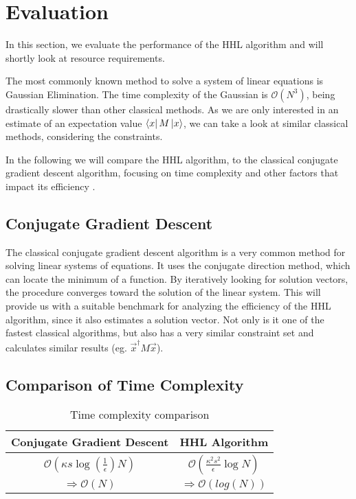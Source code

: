 \section{Evaluation}

\begin{comment}
look at gauß verfahren 
not fastest
look at same constraints 
conjugate gradient descent much faster with similiar requirements
only interested in estimate of $\vec{x}^\dagger M \vec x$
this runs in $ \mathcal{O}(\kappa s log{\left(\frac 1 \epsilon\right)} N ) $
where 
\end{comment}

In this section, we evaluate the performance of the HHL algorithm and will shortly look at resource requirements.

The most commonly known method to solve a system of linear equations is Gaussian Elimination. 
The time complexity of the Gaussian is $\mathcal{O} (N^3)$, being drastically slower than other classical methods.
As we are only interested in an estimate of an expectation value $\bra x M \ket x$, we can take a look at similar classical methods, considering the constraints.

In the following we will compare the HHL algorithm, to the classical conjugate gradient descent algorithm, focusing on time complexity and other factors that impact its efficiency \cite{hhl}.

\subsection{Conjugate Gradient Descent}
The classical conjugate gradient descent algorithm is a very common method for solving linear systems of equations. 
It uses the conjugate direction method, which can locate the minimum of a function. 
By iteratively looking for solution vectors, the procedure converges toward the solution of the linear system.
This will provide us with a suitable benchmark for analyzing the efficiency of the HHL algorithm, since it also estimates a solution vector.
Not only is it one of the fastest classical algorithms, but also has a very similar constraint set and calculates similar results (eg. $\vec{x}^\dagger M \vec x$).

\subsection{Comparison of Time Complexity }
\begin{table}[htbp]
    \caption{Time complexity comparison}
    \begin{center}
    \begin{tabular}{|c|c|}
    \hline
    \textbf{Conjugate Gradient Descent} & \textbf{HHL Algorithm} \\
    \hline
    $\mathcal{O}(\kappa s \log\left(\frac{1}{\epsilon}\right) N)$  &  $\mathcal{O}\left(\frac{\kappa^2s^2}{\epsilon}\log N\right)$\\
    \hline
    $\Rightarrow \mathcal{O} (N)$ & $\Rightarrow \mathcal{O} (log(N))$\\ 
    \hline
    \end{tabular}
    \end{center}
\end{table}

